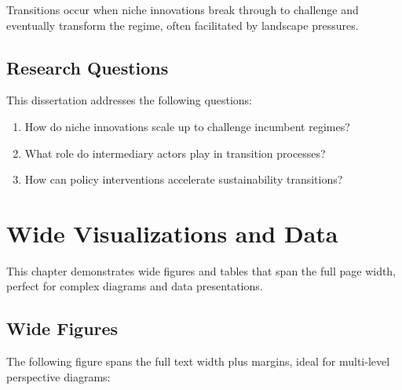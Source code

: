 \documentclass[
    fontsize=11pt,
    a4paper,
    twoside=true,
    open=any,
]{kaobook}
\begin{document}
\begin{eurbox}[title=Key Concept]
Transitions occur when niche innovations break through to challenge and eventually transform the regime, often facilitated by landscape pressures.
\end{eurbox}

\section{Research Questions}

This dissertation addresses the following questions:

\begin{enumerate}
    \item How do niche innovations scale up to challenge incumbent regimes?
    \item What role do intermediary actors play in transition processes?
    \item How can policy interventions accelerate sustainability transitions?
\end{enumerate}


\chapter{Wide Visualizations and Data}

\margintoc

This chapter demonstrates wide figures and tables that span the full page width, perfect for complex diagrams and data presentations.

\section{Wide Figures}

The following figure spans the full text width plus margins, ideal for multi-level perspective diagrams:
\end{document}
